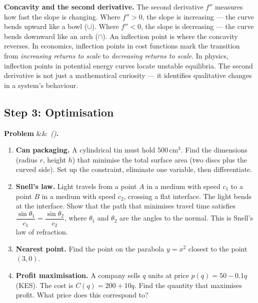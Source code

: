 \documentclass[12pt, a4paper]{article}
\newcounter{problem}
\newenvironment{problem}[1][]{%
  \refstepcounter{problem}%
  \par\vspace{6pt}%
  \noindent\textbf{\color{MidBlue}Problem \theproblem}%
  \ifx&#1&\else\ \textit{(#1)}\fi\textbf{.}\enskip
}{\par\vspace{4pt}}
\begin{document}
\begin{thought}
\textbf{Concavity and the second derivative.}
The second derivative $f''$ measures how fast the slope is changing. Where $f'' > 0$, the slope is increasing --- the curve bends upward like a bowl ($\cup$). Where $f'' < 0$, the slope is decreasing --- the curve bends downward like an arch ($\cap$). An inflection point is where the concavity reverses. In economics, inflection points in cost functions mark the transition from \emph{increasing returns to scale} to \emph{decreasing returns to scale}. In physics, inflection points in potential energy curves locate unstable equilibria. The second derivative is not just a mathematical curiosity --- it identifies qualitative changes in a system's behaviour.
\end{thought}

\subsection{Step 3: Optimisation}

\begin{problem}
\label{prob:optimise}
\begin{enumerate}[label=(\alph*), topsep=2pt]
  \item \textbf{Can packaging.} A cylindrical tin must hold $500\,\text{cm}^3$. Find the dimensions (radius $r$, height $h$) that minimise the total surface area (two discs plus the curved side). Set up the constraint, eliminate one variable, then differentiate.
  \item \textbf{Snell's law.} Light travels from a point $A$ in a medium with speed $c_1$ to a point $B$ in a medium with speed $c_2$, crossing a flat interface. The light bends at the interface. Show that the path that minimises travel time satisfies $\dfrac{\sin\theta_1}{c_1} = \dfrac{\sin\theta_2}{c_2}$, where $\theta_1$ and $\theta_2$ are the angles to the normal. This is Snell's law of refraction.
  \item \textbf{Nearest point.} Find the point on the parabola $y = x^2$ closest to the point $(3, 0)$.
  \item \textbf{Profit maximisation.} A company sells $q$ units at price $p(q) = 50 - 0.1q$ (KES). The cost is $C(q) = 200 + 10q$. Find the quantity that maximises profit. What price does this correspond to?
\end{enumerate}
\end{problem}
\end{document}
